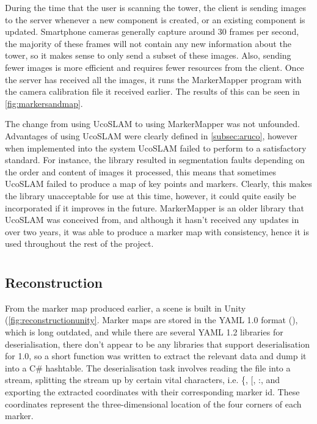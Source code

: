 During the time that the user is scanning the tower, the client is sending images to the server whenever a new component is created, or an existing component is updated. Smartphone cameras generally capture around 30 frames per second, the majority of these frames will not contain any new information about the tower, so it makes sense to only send a subset of these images. Also, sending fewer images is more efficient and requires fewer resources from the client. Once the server has received all the images, it runs the MarkerMapper program with the camera calibration file it received earlier. The results of this can be seen in \cref{fig:markersandmap}.

The change from using UcoSLAM to using MarkerMapper was not unfounded. Advantages of using UcoSLAM were clearly defined in \cref{subsec:aruco}, however when implemented into the system UcoSLAM failed to perform to a satisfactory standard. For instance, the library resulted in segmentation faults depending on the order and content of images it processed, this means that sometimes UcoSLAM failed to produce a map of key points and markers. Clearly, this makes the library unacceptable for use at this time, however, it could quite easily be incorporated if it improves in the future. MarkerMapper is an older library that UcoSLAM was conceived from, and although it hasn't received any updates in over two years, it was able to produce a marker map with consistency, hence it is used throughout the rest of the project.
    
\section{\analysis}

\subsection{Reconstruction}

From the marker map produced earlier, a scene is built in Unity  (\cref{fig:reconstructionunity}. Marker maps are stored in the YAML 1.0 format (\cite{yaml}), which is long outdated, and while there are several YAML 1.2 libraries for deserialisation, there don't appear to be any libraries that support deserialisation for 1.0, so a short function was written to extract the relevant data and dump it into a C\# hashtable. The deserialisation task involves reading the file into a stream, splitting the stream up by certain vital characters, i.e. \{, [, :, and exporting the extracted coordinates with their corresponding marker id. These coordinates represent the three-dimensional location of the four corners of each marker.

